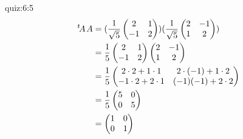 \begin{answerof}{quiz:6:5}
  \begin{align*}
    {\left.^{t}\!A\right.}A&=
    (\frac{1}{\sqrt 5}
    \begin{pmatrix}
      2&1\\
      -1&2
    \end{pmatrix})
    (\frac{1}{\sqrt 5}
    \begin{pmatrix}
      2&-1\\
      1&2
    \end{pmatrix})\\
    &=
    \frac{1}{5}
    \begin{pmatrix}
      2&1\\
      -1&2
    \end{pmatrix}
    \begin{pmatrix}
      2&-1\\
      1&2
    \end{pmatrix}\\
    &=
    \frac{1}{5}
    \begin{pmatrix}
      2\cdot 2+1\cdot 1&2\cdot (-1)+1\cdot 2\\
      -1\cdot 2+2\cdot 1&(-1)(-1)+2\cdot 2
    \end{pmatrix}\\
    &=
    \frac{1}{5}
    \begin{pmatrix}
      5&0\\
      0&5
    \end{pmatrix}\\
    &=
    \begin{pmatrix}
      1&0\\
      0&1
    \end{pmatrix}
  \end{align*}
  
\end{answerof}

